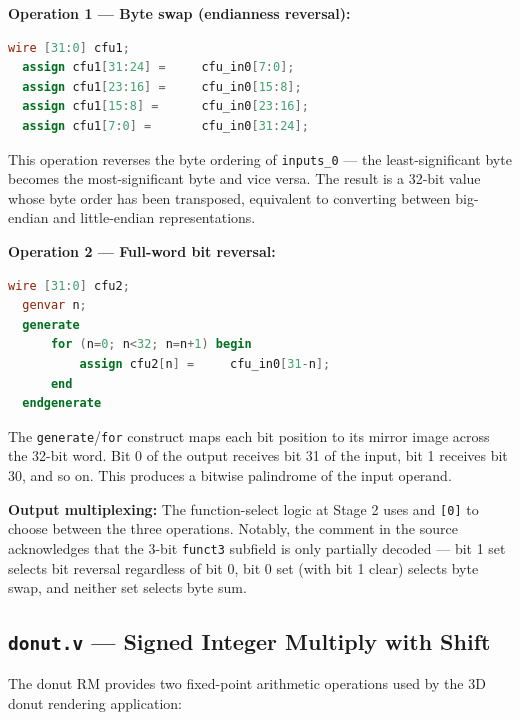 \textbf{Operation 1 — Byte swap (endianness reversal):}

\begin{lstlisting}[style=mystyle, language=Verilog]
  wire [31:0] cfu1;
  assign cfu1[31:24] =     cfu_in0[7:0];
  assign cfu1[23:16] =     cfu_in0[15:8];
  assign cfu1[15:8] =      cfu_in0[23:16];
  assign cfu1[7:0] =       cfu_in0[31:24];
\end{lstlisting}

This operation reverses the byte ordering of \texttt{inputs\_0} — the least-significant byte becomes the most-significant byte and vice versa. The result is a 32-bit value whose byte order has been transposed, equivalent to converting between big-endian and little-endian representations.

\textbf{Operation 2 — Full-word bit reversal:}

\begin{lstlisting}[style=mystyle, language=Verilog]
  wire [31:0] cfu2;
  genvar n;
  generate
      for (n=0; n<32; n=n+1) begin
          assign cfu2[n] =     cfu_in0[31-n];
      end
  endgenerate
\end{lstlisting}

The \texttt{generate}/\texttt{for} construct maps each bit position to its mirror image across the 32-bit word. Bit 0 of the output receives bit 31 of the input, bit 1 receives bit 30, and so on. This produces a bitwise palindrome of the input operand.

\textbf{Output multiplexing:} The function-select logic at Stage 2 uses  and \texttt{[0]} to choose between the three operations. Notably, the comment in the source acknowledges that the 3-bit \texttt{funct3} subfield is only partially decoded — bit 1 set selects bit reversal regardless of bit 0, bit 0 set (with bit 1 clear) selects byte swap, and neither set selects byte sum.

\subsection{\texttt{donut.v} — Signed Integer Multiply with Shift}

The donut RM provides two fixed-point arithmetic operations used by the 3D donut rendering application:

